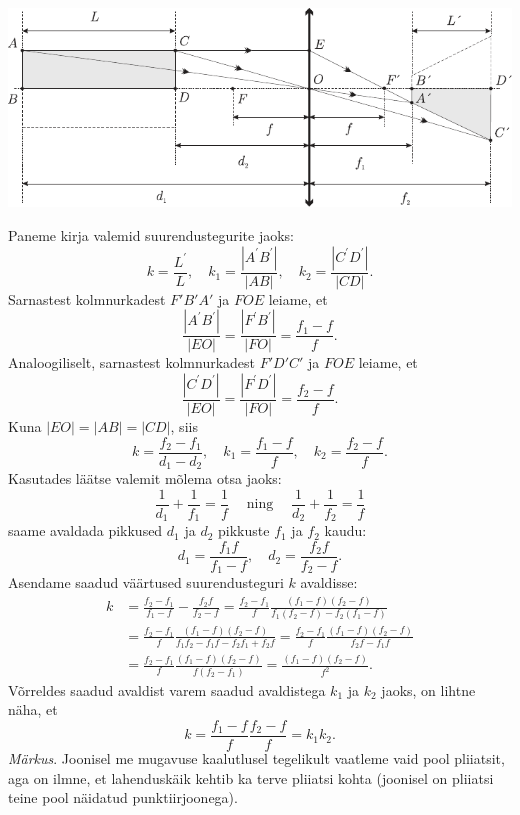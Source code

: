 \documentclass[10pt]{article}
\begin{document}
{\begin{center}
	\includegraphics[width=\linewidth]{2007-lahg-09-lah}
\end{center}

Paneme kirja valemid suurendustegurite jaoks:
\[
k=\frac{L^{\prime}}{L}, \quad k_{1}=\frac{|A^{\prime}B^{\prime}|}{|AB|}, \quad k_{2}=\frac{|C^{\prime}D^{\prime}|}{|CD|}.
\]
Sarnastest kolmnurkadest $F'B'A'$ ja $FOE$ leiame, et
\[
\frac{|A^{\prime}B^{\prime}|}{|EO|}=\frac{|F^{\prime}B^{\prime}|}{|FO|}=\frac{f_{1}-f}{f}.
\]
Analoogiliselt, sarnastest kolmnurkadest $F'D'C'$ ja $FOE$ leiame, et
\[
\frac{|C^{\prime}D^{\prime}|}{|EO|}=\frac{|F^{\prime}D^{\prime}|}{|FO|}=\frac{f_{2}-f}{f}.
\]
Kuna $|EO| = |AB| = |CD|$, siis
\[
k=\frac{f_{2}-f_{1}}{d_{1}-d_{2}}, \quad k_{1}=\frac{f_{1}-f}{f}, \quad k_{2}=\frac{f_{2}-f}{f}.
\]
Kasutades läätse valemit mõlema otsa jaoks:
\[
\frac{1}{d_{1}}+\frac{1}{f_{1}}=\frac{1}{f} \quad \operatorname{ning} \quad \frac{1}{d_{2}}+\frac{1}{f_{2}}=\frac{1}{f}
\]
saame avaldada pikkused $d_1$ ja $d_2$ pikkuste $f_1$ ja $f_2$ kaudu:
\[
d_{1}=\frac{f_{1} f}{f_{1}-f}, \quad d_{2}=\frac{f_{2} f}{f_{2}-f}.
\]
Asendame saadud väärtused suurendusteguri $k$ avaldisse:
\[
\begin{aligned}
	k&=\frac{f_{2}-f_{1}}{f_{1}-f}-\frac{f_{2} f}{f_{2}-f}=\frac{f_{2}-f_{1}}{f} \frac{\left(f_{1}-f\right)\left(f_{2}-f\right)}{f_{1}\left(f_{2}-f\right)-f_{2}\left(f_{1}-f\right)} \\ 
	&=\frac{f_{2}-f_{1}}{f} \frac{\left(f_{1}-f\right)\left(f_{2}-f\right)}{f_{1} f_{2}-f_{1} f-f_{2} f_{1}+f_{2} f}=\frac{f_{2}-f_{1}}{f} \frac{\left(f_{1}-f\right)\left(f_{2}-f\right)}{f_{2} f-f_{1} f} \\ &=\frac{f_{2}-f_{1}}{f} \frac{\left(f_{1}-f\right)\left(f_{2}-f\right)}{f\left(f_{2}-f_{1}\right)}=\frac{\left(f_{1}-f\right)\left(f_{2}-f\right)}{f^{2}}.
\end{aligned}
\]
Võrreldes saadud avaldist varem saadud avaldistega $k_1$ ja $k_2$ jaoks, on lihtne näha, et
\[
k=\frac{f_{1}-f}{f} \frac{f_{2}-f}{f}=k_{1} k_{2}.
\]
\emph{Märkus}. Joonisel me mugavuse kaalutlusel tegelikult vaatleme vaid pool pliiatsit, aga on ilmne, et lahenduskäik kehtib ka terve pliiatsi kohta (joonisel on pliiatsi teine pool näidatud punktiirjoonega).
\probend
\bigskip

}
\end{document}
